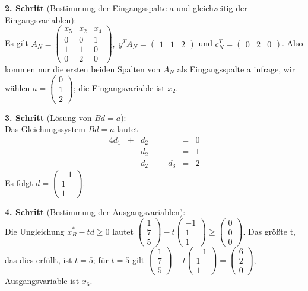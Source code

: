 \documentclass[10pt,a4paper,oneside,ngerman,numbers=noenddot]{scrartcl}
\begin{document}
		\textbf{2. Schritt} (Bestimmung der Eingangsspalte a und gleichzeitig der Eingangsvariablen):\\
		Es gilt $A_{N} = \begin{pmatrix} x_{5} & x_{2} & x_{4} \\ 0 & 0 & 1 \\ 1 & 1 & 0 \\ 0 & 2 & 0 \end{pmatrix},\; y^{T}A_{N} = \begin{pmatrix} 1 & 1 & 2 \end{pmatrix}$ und $c_{N}^{T} = \begin{pmatrix} 0 & 2 & 0\end{pmatrix}$. Also kommen nur die ersten beiden Spalten von $A_{N}$ als Eingangsspalte a infrage, wir wählen $a = \begin{pmatrix} 0 \\ 1 \\ 2 \end{pmatrix}$; die Eingangsvariable ist $x_{2}$.
		
		\textbf{3. Schritt} (Lösung von $Bd = a$):\\
		Das Gleichungssystem $Bd = a$ lautet
		\begin{alignat*}{4}
			d_{1} &+& d_{2} && &=& 0\\
			&& d_{2} && &=& 1 \\
			&& d_{2} &+& d_{3} &=& 2
		\end{alignat*}
		Es folgt $d = \begin{pmatrix} -1 \\ 1 \\ 1 \end{pmatrix}$.
		
		\textbf{4. Schritt} (Bestimmung der Ausgangsvariablen):\\
		Die Ungleichung $x_{B}^{*} - td \geq 0$ lautet $\begin{pmatrix} 1 \\ 7 \\ 5\end{pmatrix} - t \begin{pmatrix}-1 \\ 1 \\ 1 \end{pmatrix} \geq \begin{pmatrix} 0 \\ 0 \\ 0 \end{pmatrix}$. Das größte t, das dies erfüllt, ist $t = 5$; für $t = 5$ gilt $\begin{pmatrix} 1 \\ 7 \\ 5\end{pmatrix} - t \begin{pmatrix} -1 \\ 1 \\ 1 \end{pmatrix} = \begin{pmatrix} 6 \\ 2 \\ 0 \end{pmatrix}$, Ausgangsvariable ist $x_{6}$.
		
\end{document}
